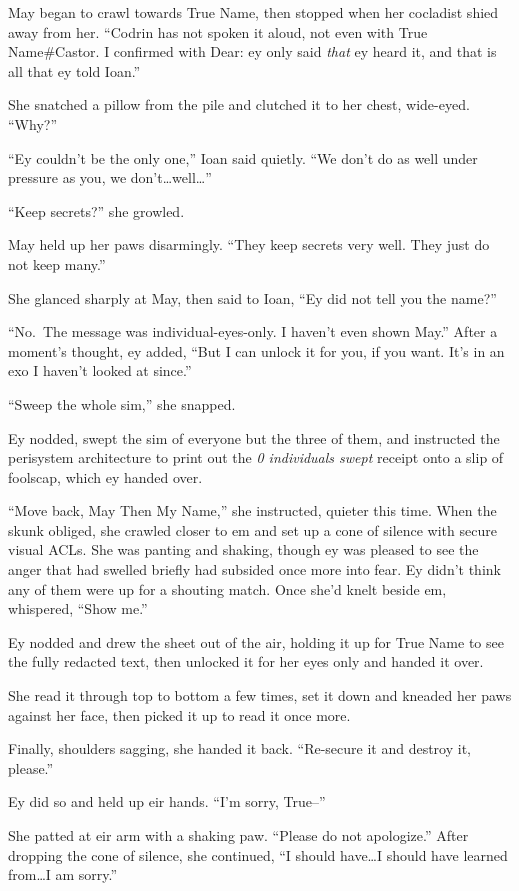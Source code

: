 May began to crawl towards True Name, then stopped when her cocladist shied away from her. ``Codrin has not spoken it aloud, not even with True Name\#Castor. I confirmed with Dear: ey only said \emph{that} ey heard it, and that is all that ey told Ioan.''

She snatched a pillow from the pile and clutched it to her chest, wide-eyed. ``Why?''

``Ey couldn't be the only one,'' Ioan said quietly. ``We don't do as well under pressure as you, we don't\ldots well\ldots{}''

``Keep secrets?'' she growled.

May held up her paws disarmingly. ``They keep secrets very well. They just do not keep many.''

She glanced sharply at May, then said to Ioan, ``Ey did not tell you the name?''

``No.~The message was individual-eyes-only. I haven't even shown May.'' After a moment's thought, ey added, ``But I can unlock it for you, if you want. It's in an exo I haven't looked at since.''

``Sweep the whole sim,'' she snapped.

Ey nodded, swept the sim of everyone but the three of them, and instructed the perisystem architecture to print out the \emph{0 individuals swept} receipt onto a slip of foolscap, which ey handed over.

``Move back, May Then My Name,'' she instructed, quieter this time. When the skunk obliged, she crawled closer to em and set up a cone of silence with secure visual ACLs. She was panting and shaking, though ey was pleased to see the anger that had swelled briefly had subsided once more into fear. Ey didn't think any of them were up for a shouting match. Once she'd knelt beside em, whispered, ``Show me.''

Ey nodded and drew the sheet out of the air, holding it up for True Name to see the fully redacted text, then unlocked it for her eyes only and handed it over.

She read it through top to bottom a few times, set it down and kneaded her paws against her face, then picked it up to read it once more.

Finally, shoulders sagging, she handed it back. ``Re-secure it and destroy it, please.''

Ey did so and held up eir hands. ``I'm sorry, True--''

She patted at eir arm with a shaking paw. ``Please do not apologize.'' After dropping the cone of silence, she continued, ``I should have\ldots I should have learned from\ldots I am sorry.''


